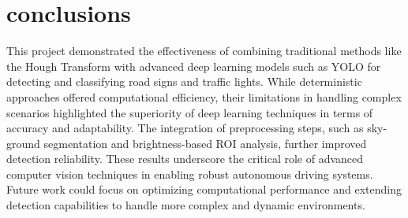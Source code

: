 \documentclass[10pt,conference,a4paper]{IEEEtran}
\begin{document}
\section{conclusions}
This project demonstrated the effectiveness of combining traditional methods like the Hough Transform with advanced deep learning models such as YOLO for detecting and classifying road signs and traffic lights. While deterministic approaches offered computational efficiency, their limitations in handling complex scenarios highlighted the superiority of deep learning techniques in terms of accuracy and adaptability. The integration of preprocessing steps, such as sky-ground segmentation and brightness-based ROI analysis, further improved detection reliability. These results underscore the critical role of advanced computer vision techniques in enabling robust autonomous driving systems. Future work could focus on optimizing computational performance and extending detection capabilities to handle more complex and dynamic environments.

\end{document}
